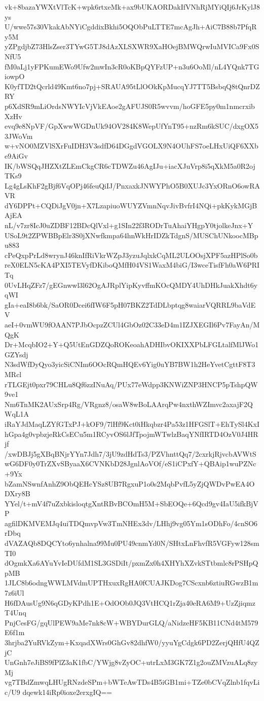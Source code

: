 vk+8bazaYWXtVlTcK+wpk6rtxeMk+ax9bUKAORDakIfVNhRjMYiQIj6JrKylJ8ys
U/wwe57s30VkakAbNYiCgddixBkhi5OQObPuLTTE7mcAgJh+AiC7B88b7PfqRy5M
yZPgdjbZ73HlsZser3TYwG5TJ8dAzXLSXWR9XaHOejBMWQrwIuMVICa9Fx0SNfU5
fM0aLj1yFPKumEWo9Ufw2mwIn3cR0oKBpQYFzUP+n3u6OoMl/nL4YQnk7TGiowpO
K0yfTD2tQcrld49Kmt6no7pj+SRAUA95tLlOOkKpMucqYJ7TT5BsbqQ8tQnrDZRY
p6XdSR9mLiOrdsNWYIcVjVkEAoe2gAFUJS0R5wvvm/hoGFE5py0m1nmcrxibXzHv
evq9e8NpVF/GpXwwWGDnUk94OV284K8WepUfYnT95+nzRm6kSUC/dxgOX53JWoVm
w+vNO0MZVlSXrFuIDH3V3sdfD64DGgdVGOLX9N4OUhFS7oeLHxUiQF6XXbe9AiGv
IK/bWSQqJHZXtZLEmCkgCR6cTDWZu46AgIJu+iacXJuVrp8i5qXkM5a0R2ojTKs9
Lg4gLsKhF2gBjf6VqOPj46feuQiIJ/PnxaxkJNWYPhO5B0XUJc3YxORnO6owRAVR
dY6DPPt+CQDiJgV0jn+X7LzapiuoWUYZVmnNqvJivBvfrI4NQi+pkKykMGjBAjEA
nL/v7zr8IcJ0uZDBF12BDcQlVxl+g1SIn22f3RODrTuAhaiYHgpY0tjolkeJnx+Y
USoL9t2ZPWBBpElr3S0jXNwfkmpa64hnWkHrIDZkTdgnS/MUSChUNkoocMBpu883
cPeQxpPrLd8wrynJ46knIfRiVkrWZpJ3yzuJqlxkCqML2ULOOsjXPF5azHPlSo0b
reX0ELN5cKA4PXI5TEVyfDKiboQMfH04VS1WaxM4biG/I3wceTisfFh0aW6PRITq
0UvLHqZFz7/gEGnwwl3l62OgAJRplYipKyvffmKOcQMDY4UhDHkJuakXhdt6yqWI
gIa+eaI8b6bk/SaOR0Dcei6fIW6F5pH07BKZ2TdDLbptqg8waiarVQRRL9baVdEV
aeI+0vmWU9fOAAN7PJbOcpzZCUl4GbOz02C33eD4m1IZJXEGIl6Pv7FayAn/MQgK
Dr+McqbIO2+Y+Q5UtEnGDZQoROKeoahADHIbvOKIXXPbLFGLtalfMlJWo1GZYsdj
N3sdWfDyQyo3yicSiCNIm6OOcRQmHQEv6Yig0uYB7BW1h2HeYvetCgttF8T3MRcl
rTLGEjt0pxr79CHLu8Qf6zzINuAq/PUx77eWdpp3KNWiZNP3HNCP5pTshpQW9ve1
Nm6TnMK2AUxSrp4Rg/VRgnz8/osaW8wBoLAArqPw4nxthWZImvc2axajF2QWqL1A
iRaYJdMaqLZYfGTxPJ+kOF9/7lHf9Kct0iHkqbzr4Pa53z1HFGSlT+EhTySl4KxI
hGpa4g0vpbzjeRkCsECu5m1RCyvOS6lJfTpojmWTwlzBaqYNfIRTD4OzV0J4HRjf
/xwDBJj5gXBqBNjrYYn7Jdh7/3jU9zdHdTs3/PZVhnttQq7/2cxrkjRjvcbAVWtS
wG6DF0y0TrZXvSByaaX6CVNKbD28JgnlAoVOf/eS1iCPxfY+QBAip1wuPZNc+9Yx
bZamNSwnfAnhZ9ObQEHcYSz8UB7RgxuP1o0s2MqbPvfL5yZjQWDvPwEA4ODXry8B
YYel/t+mV4f7uZxbkisloqtgXntRBvBCOmH5M+SbEOQe+6Qcd9gv4IaU5ifkBjVP
agfilDKMVEMJq4uiTDQmvpVw3TmNHEx3dv/LHhj9vg05Ym1sODhFo/4cnSO6rDbq
dVAZAQb8DQCYto6ynhalna99Mu0PU49cnmYd0N/SHtxLnFhvfR5VGFyw128smTI0
dOgmkXa6AYuYvIeDUfdM1SL3GSDiIt/pxmZx0h4XHYhXZvkSTtbmlc8rPSHpQpMB
1JLC8b6odngWWLMVdmUPTHxuxRgHA0fCUAJKDog7CScxnb6ztiuRGwzB1m7z6iUl
H6fDAusUg9N6qGDyKPdh1E+OdOOb0JQ3VtHCQ1rZja40eRA6M9+UzZjiqmzT4Unq
PnjCesFG/gqUlPEW9aMe7nk8cW+WBYDurGLQ/aNidzeHF5KB11CNd4tM579E6f1m
3hrjba2YuRVkZym+KxqadXWrs0GhGv82dhfW0/yyuYgCdgk6PD2ZerjQHfU4QZjC
UnGnh7eJiBS9fPlZ3aK1fbC/YWjg8vZyOC+utrLxM3GK7Z1g2ouZMVzuALq8zyMj
vg7TBdZmwqLHUgRNzdeSPm+bWTeAwTDs4B5iGB1mi+TZe0bCVqZlnb1fqvLic/U9
dqewk14iRp0ioxe2erxgIQ==
